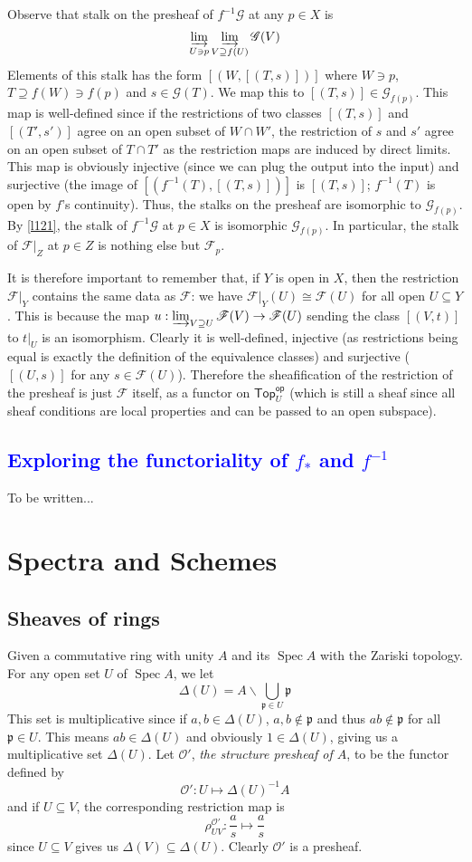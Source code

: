 \documentclass[12pt,letter]{article}
\newcommand{\D}[0]{\Delta}
\newcommand{\Spec}[0]{\operatorname{Spec}}
\newcommand{\Top}[0]{\mathsf{Top}}
\newcommand{\op}[0]{\mathsf{op}}
\begin{document}
	Observe that stalk on the presheaf of $f^{-1}\mathscr G$ at any $p\in X$ is
	\[\varinjlim_{U\ni p}\varinjlim_{V\supseteq f(U)}\mathscr G(V)\]
	Elements of this stalk has the form $[(W, [(T, s)])]$ where $W\ni p$, $T\supseteq f(W)\ni f(p)$ and $s\in \mathscr G(T)$. We map this to $[(T, s)]\in\mathscr G_{f(p)}$. This map is well-defined since if the restrictions of two classes $[(T, s)]$ and $[(T', s')]$ agree on an open subset of $W\cap W'$, the restriction of $s$ and $s'$ agree on an open subset of $T\cap T'$ as the restriction maps are induced by direct limits. This map is obviously injective (since we can plug the output into the input) and surjective (the image of $[(f^{-1}(T), [(T, s)])]$ is $[(T, s)]$; $f^{-1}(T)$ is open by $f$'s continuity). Thus, the stalks on the presheaf are isomorphic to $\mathscr G_{f(p)}$. By \autoref{l121}, the stalk of $f^{-1}\mathscr G$ at $p\in X$ is isomorphic $\mathscr G_{f(p)}$. In particular, the stalk of $\mathscr F|_Z$ at $p\in Z$ is nothing else but $\mathscr F_p$.
	
	It is therefore important to remember that, if $Y$ is open in $X$, then the restriction $\mathscr F|_Y$ contains the same data as $\mathscr F$: we have $\mathscr F|_Y(U)\cong \mathscr F(U)$ for all open $U\subseteq Y$. This is because the map $u:\varinjlim_{V\supseteq U} \mathscr F(V)\to \mathscr F(U)$ sending the class $[(V, t)]$ to $t|_U$ is an isomorphism. Clearly it is well-defined, injective (as restrictions being equal is exactly the definition of the equivalence classes) and surjective ($[(U, s)]$ for any $s\in \mathscr F(U)$). Therefore the sheafification of the restriction of the presheaf is just $\mathscr F$ itself, as a functor on $\Top_U^\op$ (which is still a sheaf since all sheaf conditions are local properties and can be passed to an open subspace).
	\textcolor{blue}{
	\subsection{Exploring the functoriality of $f_*$ and $f^{-1}$}\label{ssec-functoriality}
	}
	To be written...
	\section{Spectra and Schemes}\label{sec-scheme}
	\subsection{Sheaves of rings}\label{ssec-sheaf-of-ring}
	Given a commutative ring with unity $A$ and its $\Spec A$ with the Zariski topology. For any open set $U$ of $\Spec A$, we let
	\[\D (U)=A\backslash\bigcup_{\mathfrak p\in U}\mathfrak p\]
	This set is multiplicative since if $a, b\in\D(U)$, $a, b\notin \mathfrak p$ and thus $ab\notin \mathfrak p$ for all $\mathfrak p\in U$. This means $ab\in\D (U)$ and obviously $1\in \D(U)$, giving us a multiplicative set $\D(U)$. Let $\mathscr O'$, \textit{the structure presheaf of $A$}, to be the functor defined by
	\[\mathscr O':U\mapsto \D(U)^{-1}A\]
	and if $U\subseteq V$, the corresponding restriction map is
	\[\rho_{UV}^{\mathscr O'}:\frac{a}{s}\mapsto \frac{a}{s}\]
	since $U\subseteq V$ gives us $\D(V)\subseteq \D(U)$. Clearly $\mathscr O'$ is a presheaf.
	
\end{document}
